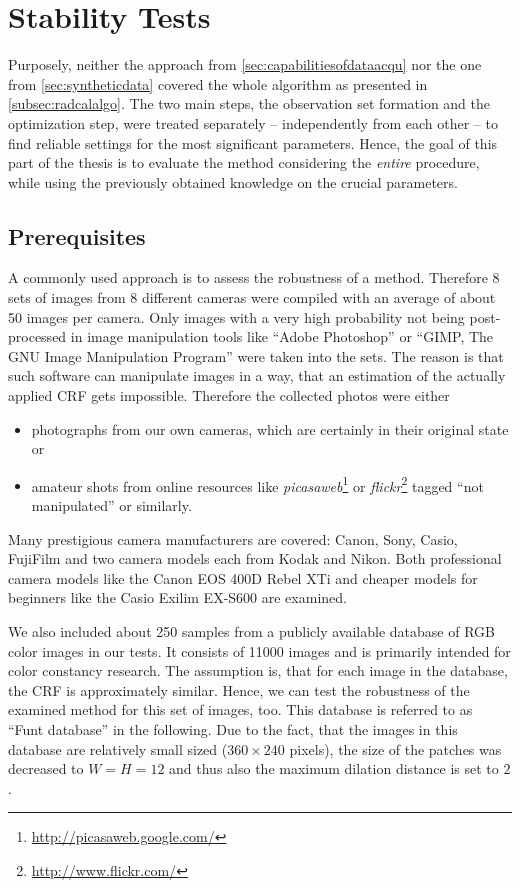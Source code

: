 \clearpage

\section{Stability Tests}
\label{sec:stability}

Purposely, neither the approach from \autoref{sec:capabilitiesofdataacqu} nor the one from \autoref{sec:syntheticdata} covered the whole algorithm as presented in \autoref{subsec:radcalalgo}. The two main steps, the observation set formation and the optimization step, were treated separately -- independently from each other -- to find reliable settings for the most significant parameters. Hence, the goal of this part of the thesis is to evaluate the method considering the \emph{entire} procedure, while using the previously obtained knowledge on the crucial parameters. 


\subsection{Prerequisites}
\label{subsec:stabilityPrerequisites}

A commonly used approach is to assess the robustness of a method. Therefore 8 sets of images from 8 different cameras were compiled with an average of about 50 images per camera. Only images with a very high probability not being post-processed in image manipulation tools like ``Adobe Photoshop'' \cite{photoshop} or ``GIMP, The GNU Image Manipulation Program'' \cite{gimp} were taken into the sets. The reason is that such software can manipulate images in a way, that an estimation of the actually applied CRF gets impossible. Therefore the collected photos were either
\begin{itemize}
	\item photographs from our own cameras, which are certainly in their original state or
	\item amateur shots from online resources like \emph{picasaweb}\footnote{\url{http://picasaweb.google.com/}} or \emph{flickr}\footnote{\url{http://www.flickr.com/}} tagged ``not manipulated'' or similarly.
\end{itemize}
Many prestigious camera manufacturers are covered: Canon, Sony, Casio, FujiFilm and two camera models each from Kodak and Nikon. Both professional camera models like the Canon EOS 400D Rebel XTi and cheaper models for beginners like the Casio Exilim EX-S600 are examined. 

We also included about 250 samples from a publicly available database of RGB color images \cite{ciurea2003large} in our tests. It consists of 11000 images and is primarily intended for color constancy research. The assumption is, that for each image in the database, the CRF is approximately similar. Hence, we can test the robustness of the examined method for this set of images, too. This database is referred to as ``Funt database'' in the following. Due to the fact, that the images in this database are relatively small sized ($360 \times 240$ pixels), the size of the patches was decreased to $W = H = 12$ and thus also the maximum dilation distance is set to $2$.



